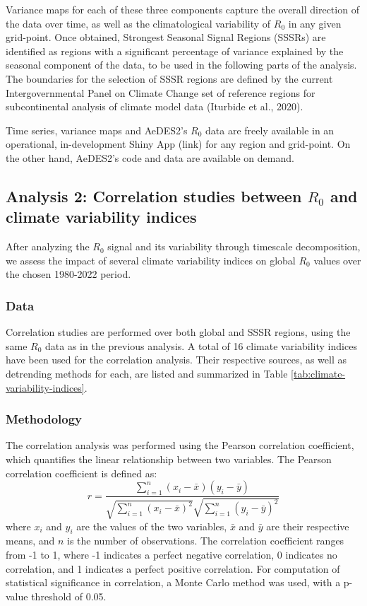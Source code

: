 \documentclass[
	a4paper, %
	8pt, %
	unnumberedsections, %
	twoside, %
]{LTJournalArticle}
\begin{document}
  Variance maps for each of these three components capture the overall direction of the data over time, as well as the climatological variability of $R_0$ in any given grid-point. Once obtained, Strongest Seasonal Signal Regions (SSSRs) are identified as regions with a significant percentage of variance explained by the seasonal component of the data, to be used in the following parts of the analysis. The boundaries for the selection of SSSR regions are defined by the current Intergovernmental Panel on Climate Change set of reference regions for subcontinental analysis of climate model data (Iturbide et al., 2020).  

  Time series, variance maps and AeDES2's $R_0$ data are freely available in an operational, in-development Shiny App (link) for any region and grid-point. On the other hand, AeDES2's code and data are available on demand.

  \subsection{Analysis 2: Correlation studies between $R_0$ and climate variability indices} \label{sec-methods-2}

  After analyzing the $R_0$ signal and its variability through timescale decomposition, we assess the impact of several climate variability indices on global $R_0$ values over the chosen 1980-2022 period.  

  \subsubsection{Data} \label{sec-methods-2-data}

  Correlation studies are performed over both global and SSSR regions, using the same $R_0$ data as in the previous analysis. A total of 16 climate variability indices have been used for the correlation analysis. Their respective sources, as well as detrending methods for each, are listed and summarized in Table \ref{tab:climate-variability-indices}.

  \subsubsection{Methodology} \label{sec-methods-2-methodology}

  The correlation analysis was performed using the Pearson correlation coefficient, which quantifies the linear relationship between two variables. The Pearson correlation coefficient is defined as:
  \begin{equation}
      r = \frac{\sum_{i=1}^{n} (x_i - \bar{x})(y_i - \bar{y})}{\sqrt{\sum_{i=1}^{n} (x_i - \bar{x})^2} \sqrt{\sum_{i=1}^{n} (y_i - \bar{y})^2}}
  \end{equation}
  where $x_i$ and $y_i$ are the values of the two variables, $\bar{x}$ and $\bar{y}$ are their respective means, and $n$ is the number of observations. The correlation coefficient ranges from -1 to 1, where -1 indicates a perfect negative correlation, 0 indicates no correlation, and 1 indicates a perfect positive correlation. For computation of statistical significance in correlation, a Monte Carlo method was used, with a p-value threshold of 0.05.
\end{document}
